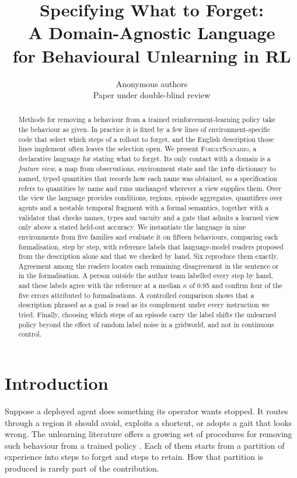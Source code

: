 \documentclass{article}
\title{Specifying What to Forget:\\A Domain-Agnostic Language\\for Behavioural Unlearning in RL}
\author{Anonymous authors\\Paper under double-blind review}
\begin{document}
\maketitle

\begin{abstract}
Methods for removing a behaviour from a trained reinforcement-learning
policy take the behaviour as given. In practice it is fixed by a few lines
of environment-specific code that select which steps of a rollout to
forget, and the English description those lines implement often leaves
the selection open. We present \textsc{ForgetScenario}, a declarative
language for stating what to forget. Its only contact with a domain is a
\emph{feature view}, a map from observations, environment state and the
\texttt{info} dictionary to named, typed quantities that records how each
name was obtained, so a specification refers to quantities by name and
runs unchanged wherever a view supplies them. Over the view the language
provides conditions, regions, episode aggregates, quantifiers over agents
and a nestable temporal fragment with a formal semantics, together with a
validator that checks names, types and vacuity and a gate that admits a
learned view only above a stated held-out accuracy. We
instantiate the language in nine environments from five families and
evaluate it on fifteen behaviours, comparing each formalisation, step by step, with reference labels that language-model readers proposed from the
description alone and that we checked by hand. Six reproduce them
exactly. Agreement among the
readers locates each
remaining disagreement in the sentence or in the formalisation. A person
outside the author team labelled every step by hand, and these labels
agree with the reference at a median $\kappa$ of 0.95 and confirm four of
the five errors attributed to formalisations. A
controlled comparison shows that a description phrased as a goal is read
as its complement under every instruction we tried. Finally, choosing
which steps of an episode carry the label shifts the unlearned policy
beyond the effect of random label noise in a gridworld, and not in
continuous control.
\end{abstract}

\section{Introduction}

Suppose a deployed agent does something its operator wants stopped. It
routes through a region it should avoid, exploits a shortcut, or adopts a
gait that looks wrong. The unlearning literature offers a growing set of
procedures for removing such behaviour from a trained policy
\citep{bourtoule2021machine,cao2015towards,zhang2024npo}. Each of them
starts from a partition of experience into steps to forget and steps to
retain. How that partition is produced is rarely part of the
contribution.
\end{document}
